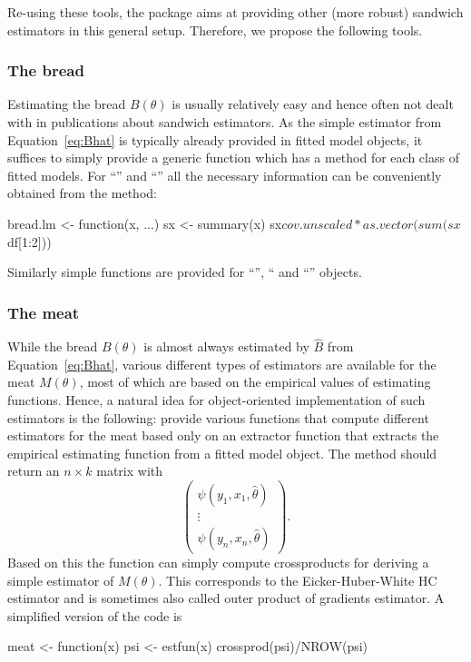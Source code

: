 \documentclass{Z}
\begin{document}
Re-using these tools, the  package aims at providing other (more robust)
sandwich estimators in this general setup. Therefore, we propose the following tools. 


\subsubsection*{The bread}

Estimating the bread $B(\theta)$ is usually relatively easy and hence often 
not dealt with in publications about sandwich estimators. As the simple estimator
from Equation~\ref{eq:Bhat} is typically already provided in fitted model objects,
it suffices to simply provide a generic function  which has a method
for each class of fitted models. For ``'' and ``'' all the necessary
information can be conveniently obtained from the  method:
\begin{Schunk}
\begin{Sinput}
bread.lm <- function(x, ...)
{
  sx <- summary(x)
  sx$cov.unscaled * as.vector(sum(sx$df[1:2]))
}
\end{Sinput}
\end{Schunk}
Similarly simple functions are provided for ``'', `` and
``'' objects.


\subsubsection*{The meat}

While the bread $B(\theta)$ is almost always estimated by $\hat B$ from Equation~\ref{eq:Bhat},
various different types of estimators are available for the meat $M(\theta)$, most of which
are based on the empirical values of estimating functions. Hence, a natural idea
for object-oriented implementation of such estimators is the following: provide various 
functions that compute different estimators for the meat based only on an
 extractor function that extracts the empirical estimating function
from a fitted model object. The  method should return
an $n \times k$ matrix with
 \[ \left( \begin{array}{c} \psi(y_1, x_1, \hat \theta) \\ \vdots \\ \psi(y_n, x_n, \hat \theta)
    \end{array} \right). \]
Based on this the function  can simply compute crossproducts for deriving a simple
estimator of $M(\theta)$. This corresponds to the Eicker-Huber-White HC estimator
and is sometimes also called
outer product of gradients estimator. A simplified version of the  code is
\begin{Schunk}
\begin{Sinput}
meat <- function(x)
{
  psi <- estfun(x)
  crossprod(psi)/NROW(psi)
}
\end{Sinput}
\end{Schunk}
\end{document}
